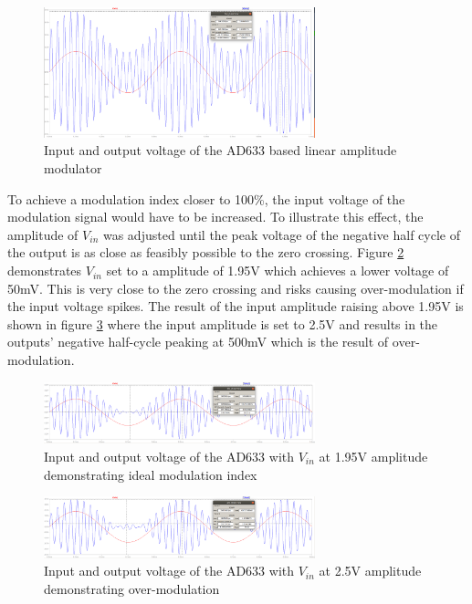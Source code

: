 \begin{figure}[ht!]
    \centering
    \includegraphics[width=0.7\textwidth]{Figures/Design/Mixer/mixerVinVoutFc.png}
    \caption{Input and output voltage of the AD633 based linear amplitude modulator}
    \label{fig:mixervinvout}
\end{figure}

To achieve a modulation index closer to 100\%, the input voltage of the modulation signal would have to be increased. To illustrate this effect, the amplitude of $V_{in}$ was adjusted until the peak voltage of the negative half cycle of the output is as close as feasibly possible to the zero crossing. Figure \ref{fig:mixervin195} demonstrates $V_{in}$ set to a amplitude of 1.95V which achieves a lower voltage of 50mV. This is very close to the zero crossing and risks causing over-modulation if the input voltage spikes. The result of the input amplitude raising above 1.95V is shown in figure \ref{fig:mixervin25} where the input amplitude is set to 2.5V and results in the outputs' negative half-cycle peaking at 500mV which is the result of over-modulation.

\begin{figure}[ht!]
    \centering
    \includegraphics[width=0.7\textwidth]{Figures/Design/Mixer/195Vm10Vc.png}
    \caption{Input and output voltage of the AD633 with $V_{in}$ at 1.95V amplitude demonstrating ideal modulation index}
    \label{fig:mixervin195}
\end{figure}

\begin{figure}[ht!]
    \centering
    \includegraphics[width=0.7\textwidth]{Figures/Design/Mixer/25Vm10VcOvermod.png}
    \caption{Input and output voltage of the AD633 with $V_{in}$ at 2.5V amplitude demonstrating over-modulation}
    \label{fig:mixervin25}
\end{figure}

